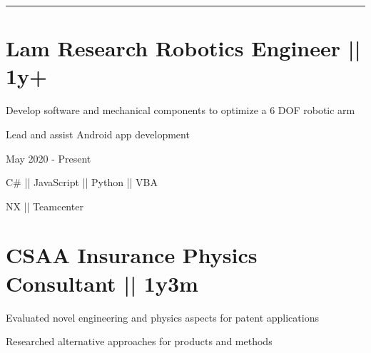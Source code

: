 \documentclass[letterpaper,10pt,oneside]{article}
\begin{document}
\begin{body}
\vspace{-1.6ex}
{\hspace{-1.73in}\noindent\color{dblue}\rule{6.935in}{0.4pt}} %
\vspace{-5ex}


\section
{\textbf{Lam Research}
\newline
Robotics Engineer || 1y+
\newline}


\vspace{-2.5ex}
\begin{detail}
\BulletItem
Develop software and mechanical components to optimize a 6 DOF robotic arm 

\BulletItem
Lead and assist Android app development
\end{detail}

\begin{subtitle}
\vspace{-7.8ex}
{{May 2020 - Present}} 
\end{subtitle}

{
\vspace{0.5ex}
\color{cyan}\small
{C\# || JavaScript || Python || VBA} %
}

{
\vspace{-2.5ex}\hspace{3.17in}
\color{cyan}\small
{NX || Teamcenter} %
}
\vspace{-1.5ex}

\section
{\textbf{CSAA Insurance}
\newline
Physics Consultant || 1y3m
\newline}



\begin{detail}
\vspace{-2.0ex}
\BulletItem
Evaluated novel engineering and physics aspects for patent applications

\BulletItem
Researched alternative approaches for products and methods
\end{detail}


\end{body}
\end{document}
